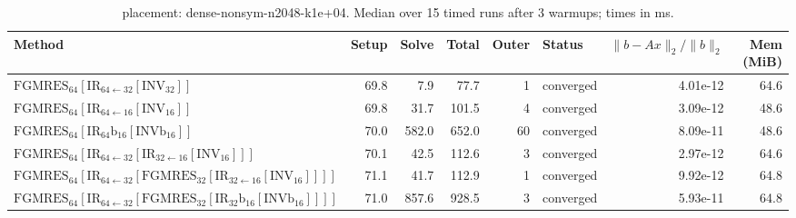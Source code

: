 \begin{table}[t]
\centering
\small
\caption{placement: dense-nonsym-n2048-k1e+04. Median over 15 timed runs after 3 warmups; times in ms.}
\label{tab:placement-dense-nonsym-n2048-k1e+04}
\begin{tabular}{lrrrrlrr}
\hline
Method & Setup & Solve & Total & Outer & Status & $\|b-Ax\|_2/\|b\|_2$ & Mem (MiB) \\
\hline
$\mathrm{FGMRES}_{64}[\mathrm{IR}_{64\leftarrow 32}[\mathrm{INV}_{32}]]$ & 69.8 & 7.9 & 77.7 & 1 & converged & 4.01e-12 & 64.6 \\
$\mathrm{FGMRES}_{64}[\mathrm{IR}_{64\leftarrow 16}[\mathrm{INV}_{16}]]$ & 69.8 & 31.7 & 101.5 & 4 & converged & 3.09e-12 & 48.6 \\
$\mathrm{FGMRES}_{64}[\mathrm{IR}_{64}{\mathrm{b}_{16}}[\mathrm{INVb}_{16}]]$ & 70.0 & 582.0 & 652.0 & 60 & converged & 8.09e-11 & 48.6 \\
$\mathrm{FGMRES}_{64}[\mathrm{IR}_{64\leftarrow 32}[\mathrm{IR}_{32\leftarrow 16}[\mathrm{INV}_{16}]]]$ & 70.1 & 42.5 & 112.6 & 3 & converged & 2.97e-12 & 64.6 \\
$\mathrm{FGMRES}_{64}[\mathrm{IR}_{64\leftarrow 32}[\mathrm{FGMRES}_{32}[\mathrm{IR}_{32\leftarrow 16}[\mathrm{INV}_{16}]]]]$ & 71.1 & 41.7 & 112.9 & 1 & converged & 9.92e-12 & 64.8 \\
$\mathrm{FGMRES}_{64}[\mathrm{IR}_{64\leftarrow 32}[\mathrm{FGMRES}_{32}[\mathrm{IR}_{32}{\mathrm{b}_{16}}[\mathrm{INVb}_{16}]]]]$ & 71.0 & 857.6 & 928.5 & 3 & converged & 5.93e-11 & 64.8 \\
\hline
\end{tabular}
\end{table}
